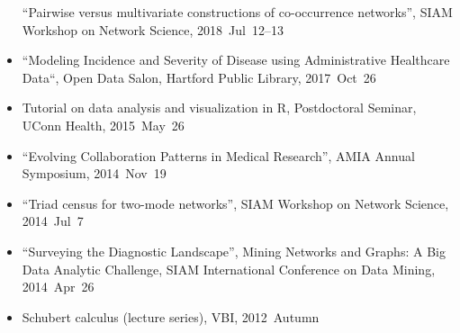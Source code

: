 \documentclass[10pt,a4paper]{article}
\begin{document}
\begin{itemize}[label=$\circ$,nolistsep]
``Pairwise versus multivariate constructions of co-occurrence networks'', SIAM Workshop on Network Science, 2018~Jul~12--13
\item
``Modeling Incidence and Severity of Disease using Administrative Healthcare Data``, Open Data Salon, Hartford Public Library, 2017~Oct~26
\item
Tutorial on data analysis and visualization in R, Postdoctoral Seminar, UConn Health, 2015~May~26
\item
``Evolving Collaboration Patterns in Medical Research'', AMIA Annual Symposium, 2014~Nov~19
\item
``Triad census for two-mode networks'', SIAM Workshop on Network Science, 2014~Jul~7
\item
``Surveying the Diagnostic Landscape'', Mining Networks and Graphs: A Big Data Analytic Challenge, SIAM International Conference on Data Mining, 2014~Apr~26
\item
Schubert calculus (lecture series), VBI, 2012~Autumn

\end{itemize}
\end{document}
